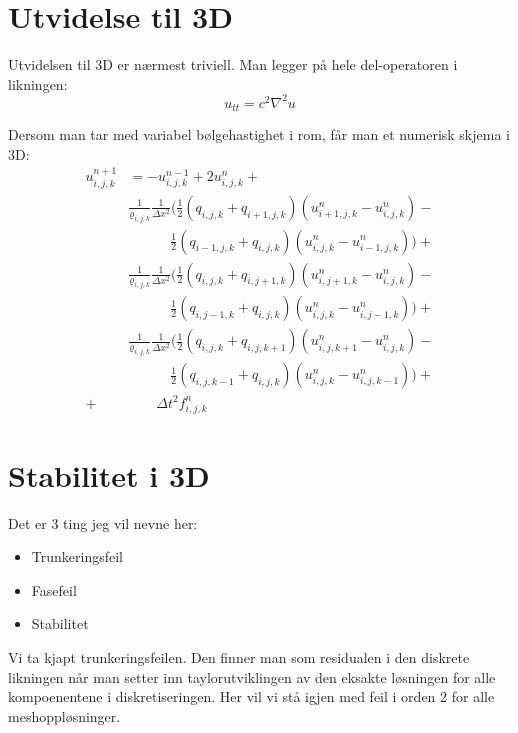 \documentclass[a4paper, 10pt]{article}
\begin{document}
\section{Utvidelse til 3D}
Utvidelsen til 3D er nærmest triviell. Man legger på hele del-operatoren i likningen:
\begin{equation}
	u_{tt} = c^2 \nabla^2 u
\end{equation}

Dersom man tar med variabel bølgehastighet i rom, får man et numerisk skjema i 3D:
\begin{align*}
u^{n+1}_{i,j,k} &= - u^{n-1}_{i,j,k}  + 2u^{n}_{i,j,k} + \\ 
 & \frac{1}{\varrho_{i,j,k}}\frac{1}{\Delta x^2} ( \frac{1}{2}(q_{i,j,k} + q_{i+1,j,k})(u^{n}_{i+1,j,k} - u^{n}_{i,j,k}) - \\ 
&\qquad\quad \frac{1}{2}(q_{i-1,j,k} + q_{i,j,k})(u^{n}_{i,j,k} - u^{n}_{i-1,j,k})) + \\ 
 & \frac{1}{\varrho_{i,j,k}}\frac{1}{\Delta x^2} ( \frac{1}{2}(q_{i,j,k} + q_{i,j+1,k})(u^{n}_{i,j+1,k} - u^{n}_{i,j,k}) - \\ 
&\qquad\quad\frac{1}{2}(q_{i,j-1,k} + q_{i,j,k})(u^{n}_{i,j,k} - u^{n}_{i,j-1,k})) + \\ 
 & \frac{1}{\varrho_{i,j,k}}\frac{1}{\Delta x^2} ( \frac{1}{2}(q_{i,j,k} + q_{i,j,k+1})(u^{n}_{i,j,k+1} - u^{n}_{i,j,k}) -\\ 
&\qquad\quad \frac{1}{2}(q_{i,j,k-1} + q_{i,j,k})(u^{n}_{i,j,k} - u^{n}_{i,j,k-1})) + \\ 
+ &\qquad \Delta t^2 f^n_{i,j,k}
\end{align*}

\section{Stabilitet i 3D}
Det er 3 ting jeg vil nevne her:
\begin{itemize}
\item Trunkeringsfeil
\item Fasefeil
\item Stabilitet
\end{itemize}

Vi ta kjapt trunkeringsfeilen. Den finner man som residualen i den diskrete likningen når man setter inn taylorutviklingen av den eksakte løsningen for alle kompoenentene i diskretiseringen. Her vil vi stå igjen med feil i orden 2 for alle meshoppløsninger. 
\end{document}
